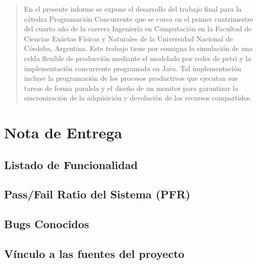 \documentclass[10pt]{article} %
\begin{document}

\tableofcontents %

\newpage %


\begin{abstract}
En el presente informe se expone el desarrollo del trabajo final para la cátedra Programación Concurrente que se cursa en el primer cuatrimestre del cuarto año de la carrera Ingeniería en Computación en la Facultad de Ciencias Exáctas Físicas y Naturales de la Universidad Nacional de Córdoba, Argentina. 
Este trabajo tiene por consigna la simulación de una celda flexible de producción mediante el modelado por redes de petri y la implementación concurrente programada en Java. Tal implementación incluye la programación de los procesos productivos que ejecutan sus tareas de forma paralela y el diseño de un monitor para garantizar la sincronización de la adquisición y devolución de los recursos compartidos.

\end{abstract} %

\section{Nota de Entrega}

\subsection{Listado de Funcionalidad}

\subsection{Pass/Fail Ratio del Sistema (PFR)}

\subsection{Bugs Conocidos}

\subsection{Vínculo a las fuentes del proyecto}
\end{document}
